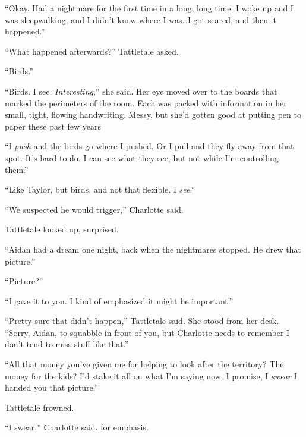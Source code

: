 ``Okay.  Had a nightmare for the first time in a long, long time.  I woke up and I was sleepwalking, and I didn't know where I was\ldots I got scared, and then it happened.''



``What happened afterwards?'' Tattletale asked.



``Birds.''



``Birds.  I see.  \emph{Interesting},'' she said.  Her eye moved over to the boards that marked the perimeters of the room.  Each was packed with information in her small, tight, flowing handwriting.  Messy, but she'd gotten good at putting pen to paper these past few years



``I \emph{push} and the birds go where I pushed.  Or I pull and they fly away from that spot.  It's hard to do.  I can see what they see, but not while I'm controlling them.''



``Like Taylor, but birds, and not that flexible.  I \emph{see}.''



``We suspected he would trigger,'' Charlotte said.



Tattletale looked up, surprised.



``Aidan had a dream one night, back when the nightmares stopped.  He drew that picture.''



``Picture?''



``I gave it to you.  I kind of emphasized it might be important.''



``Pretty sure that didn't happen,'' Tattletale said.  She stood from her desk.  ``Sorry, Aidan, to squabble in front of you, but Charlotte needs to remember I don't tend to miss stuff like that.''



``All that money you've given me for helping to look after the territory?  The money for the kids?  I'd stake it all on what I'm saying now.  I promise, I \emph{swear} I handed you that picture.''



Tattletale frowned.



``I swear,'' Charlotte said, for emphasis.




